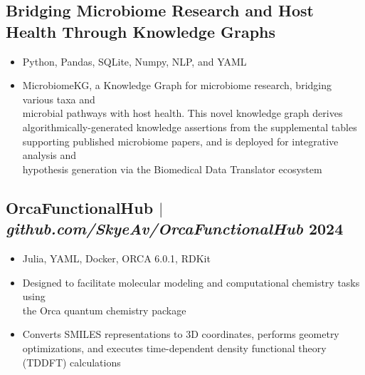 \documentclass[11pt]{article} %
\begin{document}
\subsection{\footnotesize Bridging Microbiome Research and Host Health Through Knowledge Graphs}
\begin{itemize}
  \item Python, Pandas, SQLite, Numpy, NLP, and YAML
  \item MicrobiomeKG, a Knowledge Graph for microbiome research, bridging various taxa and \\ microbial pathways with host health. This novel knowledge graph derives \\ algorithmically-generated knowledge assertions from the supplemental tables \\ supporting published microbiome papers, and is deployed for integrative analysis and \\ hypothesis generation via the Biomedical Data Translator ecosystem
\end{itemize}

\subsection{OrcaFunctionalHub $|$ \normalfont\textit{github.com/SkyeAv/OrcaFunctionalHub} \hfill 2024}
\begin{itemize}
  \item Julia, YAML, Docker, ORCA 6.0.1, RDKit
  \item Designed to facilitate molecular modeling and computational chemistry tasks using \\ the Orca quantum chemistry package
  \item Converts SMILES representations to 3D coordinates, performs geometry \\ optimizations, and executes time-dependent density functional theory (TDDFT) calculations
\end{itemize}
\end{document}
